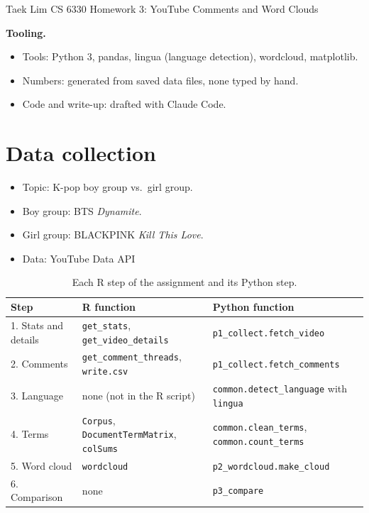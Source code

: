 \documentclass[11pt]{article}
\newcommand{\vidA}{\texorpdfstring{BTS \emph{Dynamite}}{BTS Dynamite}}
\newcommand{\vidB}{\texorpdfstring{BLACKPINK \emph{Kill This Love}}{BLACKPINK Kill This Love}}
\begin{document}
\hfill Taek Lim \quad CS 6330 Homework 3: YouTube Comments and Word Clouds

\bigskip
\textbf{Tooling.}
\begin{itemize}
  \item Tools: Python 3, pandas, lingua (language detection), wordcloud, matplotlib.
  \item Numbers: generated from saved data files, none typed by hand.
  \item Code and write-up: drafted with Claude Code.
\end{itemize}

\section{Data collection}

\begin{itemize}
  \item Topic: K-pop boy group vs.\ girl group.
  \item Boy group: \vidA.
  \item Girl group: \vidB.
  \item Data: YouTube Data API
\end{itemize}

\begin{table}[H]
\centering
\footnotesize
\begin{tabularx}{\linewidth}{@{}l>{\raggedright\arraybackslash}X>{\raggedright\arraybackslash}X@{}}
  \toprule
  Step & R function & Python function \\
  \midrule
  1. Stats and details & \texttt{get\_stats}, \texttt{get\_video\_details} & \texttt{p1\_collect.fetch\_video} \\
  \midrule
  2. Comments & \texttt{get\_comment\_threads}, \texttt{write.csv} & \texttt{p1\_collect.fetch\_comments} \\
  \midrule
  3. Language & none (not in the R script) & \texttt{common.detect\_language} with \texttt{lingua} \\
  \midrule
  4. Terms & \texttt{Corpus}, \texttt{DocumentTermMatrix}, \texttt{colSums} & \texttt{common.clean\_terms}, \texttt{common.count\_terms} \\
  \midrule
  5. Word cloud & \texttt{wordcloud} & \texttt{p2\_wordcloud.make\_cloud} \\
  \midrule
  6. Comparison & none & \texttt{p3\_compare} \\
  \bottomrule
\end{tabularx}
\caption{Each R step of the assignment and its Python step.}\label{tab:pipeline}
\end{table}
\end{document}
